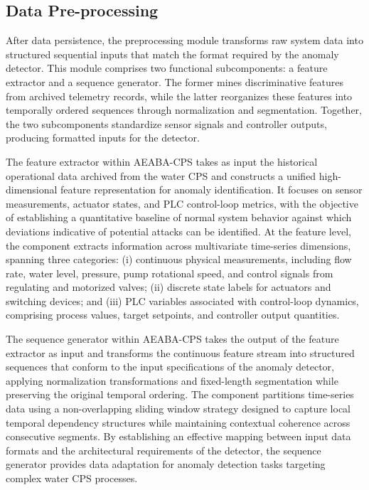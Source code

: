 \documentclass[pdflatex,sn-mathphys-num]{sn-jnl}
\theoremstyle{thmstyleone}
\theoremstyle{thmstyletwo}
\theoremstyle{thmstylethree}
\begin{document}
\subsection{Data Pre-processing}
After data persistence, the preprocessing module transforms raw system data into structured sequential inputs that match the format required by the anomaly detector. This module comprises two functional subcomponents: a feature extractor and a sequence generator. The former mines discriminative features from archived telemetry records, while the latter reorganizes these features into temporally ordered sequences through normalization and segmentation. Together, the two subcomponents standardize sensor signals and controller outputs, producing formatted inputs for the detector.

The feature extractor within AEABA-CPS takes as input the historical operational data archived from the water CPS and constructs a unified high-dimensional feature representation for anomaly identification. It focuses on sensor measurements, actuator states, and PLC control-loop metrics, with the objective of establishing a quantitative baseline of normal system behavior against which deviations indicative of potential attacks can be identified. At the feature level, the component extracts information across multivariate time-series dimensions, spanning three categories: (i) continuous physical measurements, including flow rate, water level, pressure, pump rotational speed, and control signals from regulating and motorized valves; (ii) discrete state labels for actuators and switching devices; and (iii) PLC variables associated with control-loop dynamics, comprising process values, target setpoints, and controller output quantities.

The sequence generator within AEABA-CPS takes the output of the feature extractor as input and transforms the continuous feature stream into structured sequences that conform to the input specifications of the anomaly detector, applying normalization transformations and fixed-length segmentation while preserving the original temporal ordering. The component partitions time-series data using a non-overlapping sliding window strategy designed to capture local temporal dependency structures while maintaining contextual coherence across consecutive segments.
By establishing an effective mapping between input data formats and the architectural requirements of the detector, the sequence generator provides data adaptation for anomaly detection tasks targeting complex water CPS processes.
\end{document}
